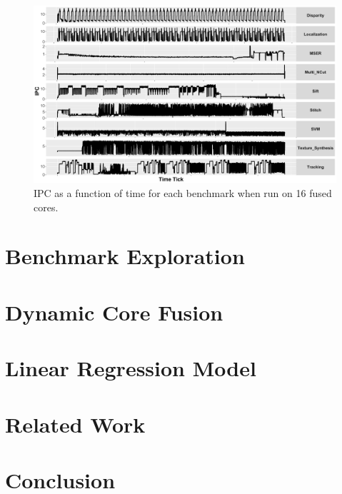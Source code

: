 \begin{figure}[t]
    \centering
    \includegraphics[width=1\textwidth]{cases-paper/graphics/Exploration/ipcs_16_2.pdf}
    \vspace*{-8mm}
    \caption{IPC as a function of time for each benchmark when run on 16 fused cores.}
    \label{fig:sxt}
\vspace{5mm}
\end{figure}

\vspace{5mm}
\section{Benchmark Exploration}\label{sec:expl}


\section{Dynamic Core Fusion}\label{sec:dynamic}



\section{Linear Regression Model}\label{sec:model}


\section{Related Work}\label{sec:related}


\section{Conclusion}\label{sec:conc}



 

